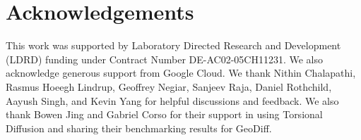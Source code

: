 \section{Acknowledgements}
This work was supported by Laboratory Directed Research and Development (LDRD) funding under Contract Number DE-AC02-05CH11231. We also acknowledge generous support from Google Cloud. We thank Nithin Chalapathi, Rasmus Hoeegh Lindrup, Geoffrey Negiar, Sanjeev Raja, Daniel Rothchild, Aayush Singh, and Kevin Yang for helpful discussions and feedback. We also thank Bowen Jing and Gabriel Corso for their support in using Torsional Diffusion and sharing their benchmarking results for GeoDiff.

